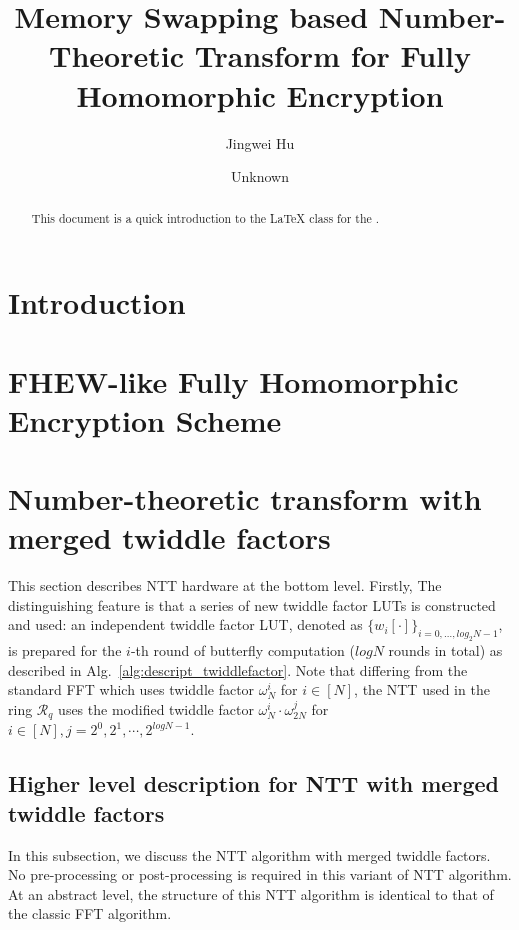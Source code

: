 \documentclass{iacrtrans}
\author{Jingwei Hu\inst{1} \and Unknown\inst{2}}
\institute{Nanyang Technological University, Singapore, \email{davidhu@ntu.edu.sg} \and
           Unknown}
\title[]{Memory Swapping based Number-Theoretic Transform for Fully Homomorphic Encryption}
\subtitle{}
\theoremstyle{plain}
\begin{document}
\maketitle


\begin{abstract}
  This document is a quick introduction to the \LaTeX{} class for the
  \publname{}.
\end{abstract}

\tableofcontents{}

\section*{Introduction}

\section{FHEW-like Fully Homomorphic Encryption Scheme}

\section{Number-theoretic transform with merged twiddle factors}
This section describes NTT hardware at the bottom level. Firstly,  The distinguishing feature is that a series of new twiddle factor LUTs  is constructed and used:  an independent twiddle factor LUT, denoted as $\{w_i[\cdot]\}_{i=0,\ldots,log_2N-1}$, is prepared for the $i$-th round of butterfly computation ($logN$ rounds in total) as described in Alg.~\ref{alg:descript_twiddlefactor}. Note that differing from the standard FFT which uses twiddle factor $\omega_{N}^i$ for $i\in [N]$, the NTT used in the ring $\mathcal{R}_q$ uses the modified twiddle factor $\omega_N^i\cdot\omega_{2N}^j$ for $i\in [N], j=2^0,2^1,\cdots,2^{logN-1}$.

\subsection{Higher level description for NTT with merged twiddle factors}\label{sec:gf2m_arith}

In this subsection, we discuss the NTT algorithm with merged twiddle factors. No pre-processing or post-processing is required in this variant of NTT algorithm. At an abstract level, the structure of this NTT algorithm is identical to that of the classic FFT algorithm. 
\end{document}
